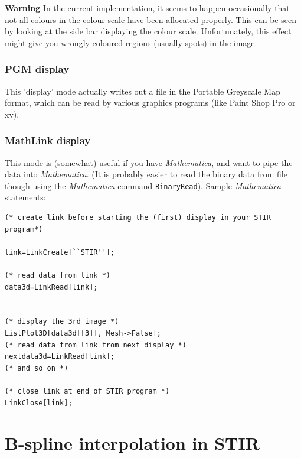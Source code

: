 \documentclass{article}
\begin{document}
{{{{{{\textbf{Warning} In the current implementation, it seems to happen 
occasionally that not all colours in the colour scale have been 
allocated properly. This can be seen by looking at the side bar 
displaying the colour scale. Unfortunately, this effect might 
give you wrongly coloured regions (usually spots) in the image.


\subsubsection{
PGM display}

This 'display' mode actually writes out a file in the Portable 
Greyscale Map format, which can be read by various graphics programs 
(like Paint Shop Pro or xv).


\subsubsection{
MathLink display}

This mode is (somewhat) useful if you have \textit{Mathematica\texttrademark}, 
and want to pipe the data into \textit{Mathematica}. (It is probably 
easier to read the binary data from file though using the \textit{Mathematica} command \texttt{BinaryRead}). 
Sample \textit{Mathematica} statements:

\begin{verbatim}
(* create link before starting the (first) display in your STIR 
program*)

link=LinkCreate[``STIR''];

(* read data from link *)
data3d=LinkRead[link];


(* display the 3rd image *)
ListPlot3D[data3d[[3]], Mesh->False];
(* read data from link from next display *)
nextdata3d=LinkRead[link];
(* and so on *)

(* close link at end of STIR program *)
LinkClose[link];
\end{verbatim}


\section{B-spline interpolation in STIR}

}}}}}}
\end{document}
